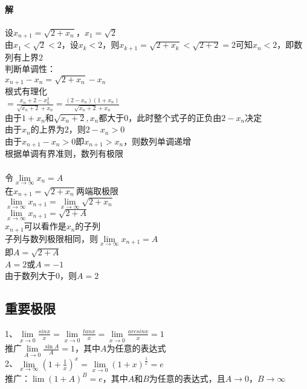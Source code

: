 \documentclass{article}
\begin{document}
\begin{flushleft}
	\paragraph{解}
	设$x_{n+1}=\sqrt{2+x_n}$，$x_1=\sqrt{2}$\\
	由$x_1<\sqrt{2}<2$，设$x_k<2$，则$x_{k+1}=\sqrt{2+x_k}<\sqrt{2+2}=2$可知$x_n<2$，即数列有上界$2$\\
	判断单调性：\\
	$x_{n+1}-x_n=\sqrt{2+x_n}-x_n$\\
	根式有理化\\
	$=\frac{x_n+2-x_n^2}{\sqrt{x_n+2}+x_n}=\frac{(2-x_n)(1+x_n)}{\sqrt{x_n+2}+x_n}$\\
	由于$1+x_n$和$\sqrt{x_n+2}, x_n$都大于0，此时整个式子的正负由$2-x_n$决定\\
	由于$x_n$的上界为$2$，则$2-x_n>0$\\
	由于$x_{n+1}-x_n>0$即$x_{n+1}>x_n$，则数列单调递增\\
	根据单调有界准则，数列有极限\\
	~\\
	令$\lim\limits_{x\to\infty}x_n=A$\\
	在$x_{n+1}=\sqrt{2+x_n}$两端取极限\\
	$\lim\limits_{x\to\infty}x_{n+1}=\lim\limits_{x\to\infty}\sqrt{2+x_n}$\\
	$\lim\limits_{x\to\infty}x_{n+1}=\sqrt{2+A}$\\
	$x_{n+1}$可以看作是$x_n$的子列\\
	子列与数列极限相同，则$\lim\limits_{x\to\infty}x_{n+1}=A$\\
	即$A=\sqrt{2+A}$\\
	$A=2$或$A=-1$\\
	由于数列大于0，则$A=2$\\
	
	\subsection{重要极限}
	1、$\lim\limits_{x\to 0} \frac{sin x}{x}=\lim\limits_{x\to 0} \frac{tan x}{x}=\lim\limits_{x\to 0} \frac{arcsin x}{x}=1$\\
	\qquad 推广$\lim\limits_{A\to 0} \frac{\sin A}{A}=1$，其中$A$为任意的表达式\\
	2、$\lim\limits_{x\to \infty} (1+\frac{1}{x})^x=\lim\limits_{x\to 0} (1+x)^{\frac{1}{x}}=e$\\
	\qquad 推广：$\lim (1+A)^{B}=e$，其中$A$和$B$为任意的表达式，且$A\to 0$，$B\to\infty$\\
	

\end{flushleft}
\end{document}
